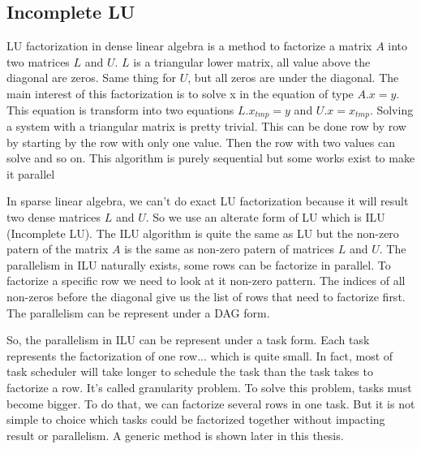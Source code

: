 \subsection{Incomplete LU}
LU factorization in dense linear algebra is a method to factorize a matrix $A$ into two matrices $L$ and $U$.
%
$L$ is a triangular lower matrix, all value above the diagonal are zeros.
%
Same thing for $U$, but all zeros are under the diagonal.
%
The main interest of this factorization is to solve x in the equation of type $A.x=y$.
%
This equation is transform into two equations $L.x_{tmp}=y$ and $U.x=x_{tmp}$.
%
Solving a system with a triangular matrix is pretty trivial.
%
This can be done row by row by starting by the row with only one value.
%
Then the row with two values can solve and so on.
%
This algorithm is purely sequential but some works exist to make it parallel %

In sparse linear algebra, we can't do exact LU factorization because it will result two dense matrices $L$ and $U$.
%
So we use an alterate form of LU which is ILU (Incomplete LU).
%
The ILU algorithm is quite the same as LU but the non-zero patern of the matrix $A$ is the same as non-zero patern of matrices $L$ and $U$.
%
The parallelism in ILU naturally exists, some rows can be factorize in parallel.
%
To factorize a specific row we need to look at it non-zero pattern.
%
The indices of all non-zeros before the diagonal give us the list of rows that need to factorize first. %
%
The parallelism can be represent under a DAG form. %

So, the parallelism in ILU can be represent under a task form.
%
Each task represents the factorization of one row... which is quite small.
%
In fact, most of task scheduler will take longer to schedule the task than the task takes to factorize a row.
%
It's called granularity problem.
%
To solve this problem, tasks must become bigger.
%
To do that, we can factorize several rows in one task.
%
But it is not simple to choice which tasks could be factorized together without impacting result or parallelism.
%
A generic method is shown later in this thesis.
